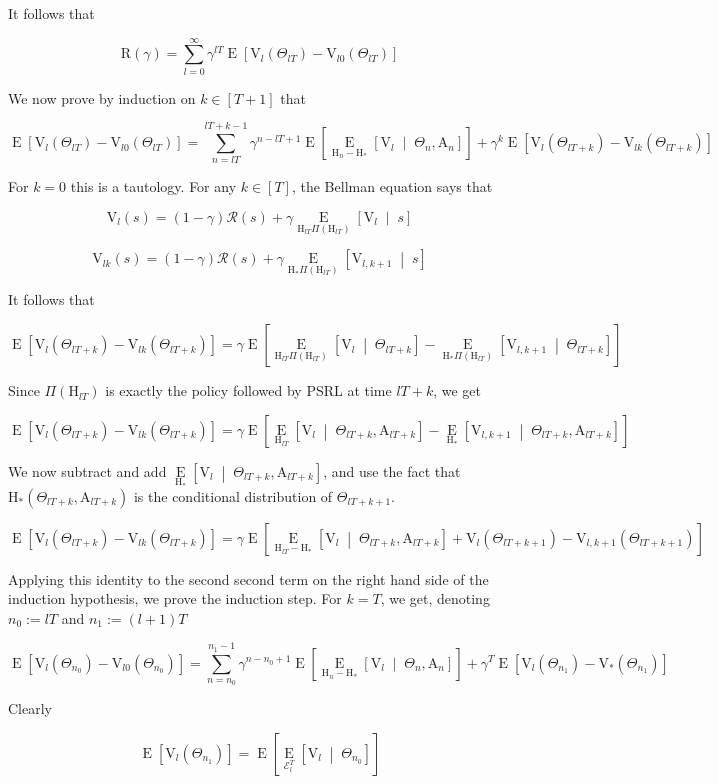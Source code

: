 \documentclass[a4paper]{article}
\newcommand{\AP}[1]{\left(#1\right)}
\newcommand{\AB}[1]{\left[#1\right]}
\newcommand{\ABM}[2]{\left[#1\;\middle\vert\;#2\right]}
\newcommand{\Ea}[2]{\underset{#1}{\operatorname{E}}\AB{#2}}
\newcommand{\CE}[3]{\underset{#1}{\operatorname{E}}\ABM{#2}{#3}}
\newcommand{\R}{\mathcal{R}}
\newcommand{\V}{\mathrm{V}}
\newcommand{\Reg}{\mathrm{R}}
\newcommand{\AT}{\mathrm{A}}
\newcommand{\THy}{\mathrm{H}_*}
\newcommand{\SHy}{\mathrm{H}}
\newcommand{\Ev}{\mathcal{E}}
\begin{document}
It follows that

$$\Reg(\gamma)=\sum_{l=0}^\infty{\gamma^{lT}\Ea{}{\V_{l}\AP{\Theta_{lT}}-\V_{l0}\AP{\Theta_{lT}}}}$$

We now prove by induction on $k\in[T+1]$ that

$$\Ea{}{\V_{l}\AP{\Theta_{lT}}-\V_{l0}\AP{\Theta_{lT}}}=\sum_{n=lT}^{lT+k-1}\gamma^{n-lT+1}\Ea{}{\CE{\SHy_n-\THy}{\V_{l}}{\Theta_n,\AT_n}}+\gamma^k\Ea{}{\V_{l}\AP{\Theta_{lT+k}}-\V_{lk}\AP{\Theta_{lT+k}}}$$

For $k=0$ this is a tautology. For any $k\in[T]$, the Bellman equation says that

$$\V_l(s)=(1-\gamma)\R(s)+\gamma\CE{\SHy_{lT}\Pi\AP{\SHy_{lT}}}{\V_l}{s}$$

$$\V_{lk}(s)=(1-\gamma)\R(s)+\gamma\CE{\SHy_{*}\Pi\AP{\SHy_{lT}}}{\V_{l,k+1}}{s}$$

It follows that

$$\Ea{}{\V_{l}\AP{\Theta_{lT+k}}-\V_{lk}\AP{\Theta_{lT+k}}}=\gamma\Ea{}{\CE{\SHy_{lT}\Pi\AP{\SHy_{lT}}}{\V_l}{\Theta_{lT+k}}-\CE{\SHy_{*}\Pi\AP{\SHy_{lT}}}{\V_{l,k+1}}{\Theta_{lT+k}}}$$

Since $\Pi\AP{\SHy_{lT}}$ is exactly the policy followed by PSRL at time $lT+k$, we get

$$\Ea{}{\V_{l}\AP{\Theta_{lT+k}}-\V_{lk}\AP{\Theta_{lT+k}}}=\gamma\Ea{}{\CE{\SHy_{lT}}{\V_l}{\Theta_{lT+k},\AT_{lT+k}}-\CE{\SHy_{*}}{\V_{l,k+1}}{\Theta_{lT+k},\AT_{lT+k}}}$$

We now subtract and add $\CE{\SHy_*}{\V_l}{\Theta_{lT+k},\AT_{lT+k}}$, and use the fact that $\SHy_*\AP{\Theta_{lT+k},\AT_{lT+k}}$ is the conditional distribution of $\Theta_{lT+k+1}$.

$$\Ea{}{\V_{l}\AP{\Theta_{lT+k}}-\V_{lk}\AP{\Theta_{lT+k}}}=\gamma\Ea{}{\CE{\SHy_{lT}-\SHy_{*}}{\V_l}{\Theta_{lT+k},\AT_{lT+k}}+\V_l\AP{\Theta_{lT+k+1}}-\V_{l,k+1}\AP{\Theta_{lT+k+1}}}$$

Applying this identity to the second second term on the right hand side of the induction hypothesis, we prove the induction step. For $k=T$, we get, denoting $n_0:=lT$ and $n_1:=(l+1)T$

$$\Ea{}{\V_{l}\AP{\Theta_{n_0}}-\V_{l0}\AP{\Theta_{n_0}}}=\sum_{n=n_0}^{n_1-1}\gamma^{n-n_0+1}\Ea{}{\CE{\SHy_n-\THy}{\V_{l}}{\Theta_n,\AT_n}}+\gamma^T\Ea{}{\V_{l}\AP{\Theta_{n_1}}-\V_{*}\AP{\Theta_{n_1}}}$$

Clearly 

$$\Ea{}{\V_l\AP{\Theta_{n_1}}}=\Ea{}{\CE{\Ev_l^T}{\V_l}{\Theta_{n_0}}}$$
\end{document}
